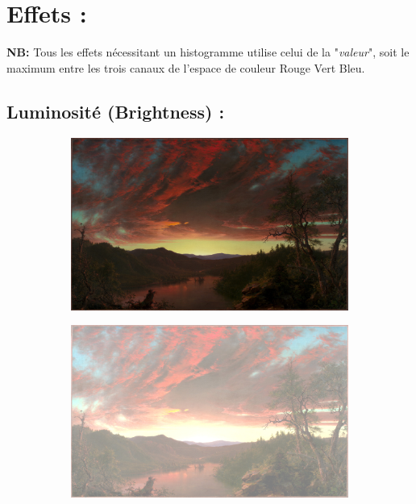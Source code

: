 \section{Effets :}
\textbf{NB:} Tous les effets nécessitant un histogramme utilise celui de la "\emph{valeur}", soit le maximum entre les trois canaux de l'espace de couleur Rouge Vert Bleu.

\subsection{Luminosité (Brightness) :}
\begin{figure}[!h]
    \centering
    \begin{subfigure}[b]{0.3\textwidth}
        \includegraphics[width=1\textwidth]{report_src/effects/original1.jpeg}
    \end{subfigure}
    \begin{subfigure}[b]{0.3\textwidth}
        \includegraphics[width=1\textwidth]{report_src/effects/brightness_high.jpeg}

\end{subfigure}
\end{figure}
